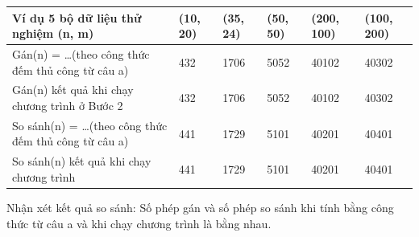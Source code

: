 \documentclass[12pt, letterpaper]{article}
\begin{document}
\pagebreak
\begin{center}
	\begin{tabular}{| m{10em} | m{1.5cm}| m{1.5cm} | m{1.5cm} | m{2cm} | m{2cm} |}
		\hline
		Ví dụ 5 bộ dữ liệu thử nghiệm (n, m)                  & (10, 20) & (35, 24) & (50, 50) & (200, 100) & (100, 200) \\
		\hline
		Gán(n) = …(theo công thức đếm thủ công từ câu a)      & 432      & 1706     & 5052     & 40102      & 40302      \\
		\hline
		Gán(n) kết quả khi chạy chương trình ở Bước 2         & 432      & 1706     & 5052     & 40102      & 40302      \\
		\hline
		So sánh(n) = …(theo  công thức đếm thủ công từ câu a) & 441      & 1729     & 5101     & 40201      & 40401      \\
		\hline
		So sánh(n) kết quả khi chạy chương trình              & 441      & 1729     & 5101     & 40201      & 40401      \\
		\hline
	\end{tabular}
\end{center}

\noindent Nhận xét kết quả so sánh: Số phép gán và số phép so sánh  khi tính bằng công thức từ câu a và khi chạy chương trình là bằng nhau.
\end{document}
